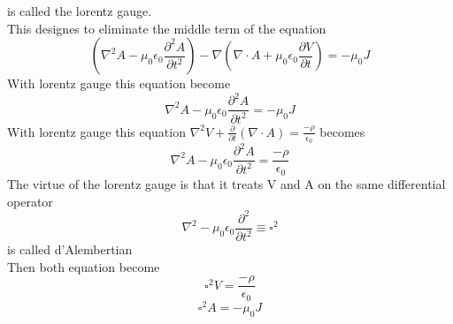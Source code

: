  is called the lorentz gauge.\\
 This designes to eliminate the middle term of the equation
$$\left( \nabla^2A-\mu_{0}\epsilon_{0}\frac{\partial^2 A}{\partial t^2}\right) -\nabla\left( \nabla \cdot A+\mu_{0}\epsilon_{0}\frac{\partial V}{\partial t}\right) =-\mu_{0} J$$
With lorentz gauge this equation become
$$\nabla^2A-\mu_{0}\epsilon_{0}\frac{\partial^2 A}{\partial t^2}=-\mu_{0} J$$
With lorentz gauge this equation 
$\nabla ^2V+\frac{\partial }{\partial t}(\nabla \cdot A)=\frac{-\rho}{\epsilon_{0}}$
becomes
$$\nabla^2A-\mu_{0}\epsilon_{0}\frac{\partial^2 A}{\partial t^2}=\frac{-\rho}{\epsilon_{0}}$$
The virtue of the lorentz gauge is that it treats V and A on the same differential operator
$$\nabla^2-\mu_{0} \epsilon_{0}\frac{\partial ^2}{\partial t^2}\equiv \square^2  $$
 is called d'Alembertian\\
Then both equation become\\
$$\square^2V=\frac{-\rho}{\epsilon_{0}}$$
$$\square^2A=-\mu_{0} J$$
